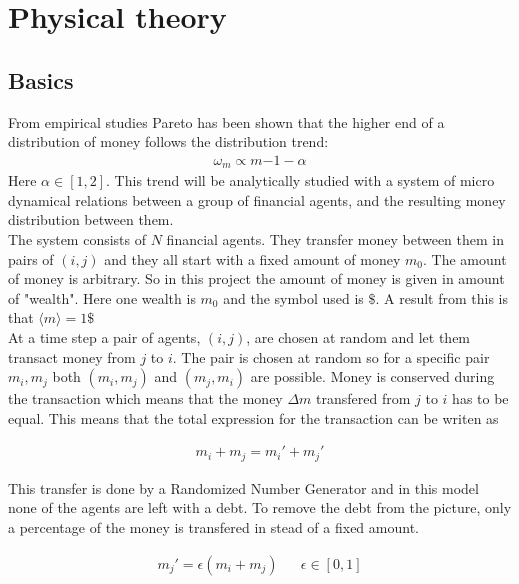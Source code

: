 \section{Physical theory}
\subsection{Basics}\label{sec:basics}

 From empirical studies Pareto  has been shown that the higher end of a distribution of money follows the distribution trend:
 \begin{align}
 	\omega_m\propto m{-1-\alpha}\label{eq:pareto}
 \end{align} 
Here $\alpha\in[1,2]$. This trend will be analytically studied with a system of micro dynamical relations between a group of financial agents, and the resulting money distribution between them. \\


The system consists of $N$ financial agents. They transfer money between them in pairs of $(i,j)$ and they all start with a fixed amount of money $m_0$. The amount of money is arbitrary. So in this project the amount of money is given in amount of "wealth". Here one wealth is $m_0$ and the symbol used is $\$$. A result from this is that $\langle m\rangle=1\$ $\\

At a time step a pair of agents, $(i,j)$, are chosen at random and let them transact money from $j$ to $i$. The pair is chosen at random so for a specific pair $m_i,m_j$ both $(m_i,m_j)$ and $(m_j,m_i)$ are possible.  Money is conserved during the transaction which means that the money $\Delta m$ transfered from $j$ to $i$ has to be equal. This means that the total expression for the transaction can be writen as

\begin{align}
	m_i+m_j=m_i'+m_j'\label{eq:pengerbevart}
\end{align}

This transfer is done by a Randomized Number Generator and in this model none of the agents are left with a debt. To remove the debt from the picture, only a percentage of the money is transfered in stead of a fixed amount.

\begin{align}
	m_j'=\epsilon(m_i+m_j)&&\epsilon\in[0,1]\label{epsiloncrit}
\end{align}

